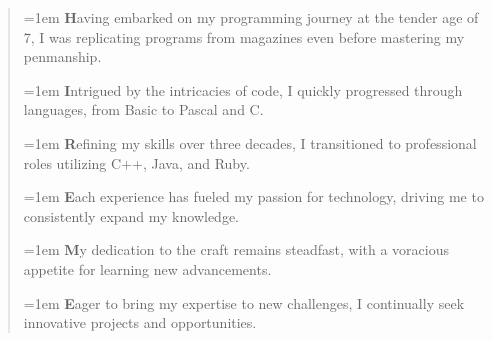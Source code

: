 \begin{minipage}{\linewidth}
\begin{quote}
    \hangindent=1em
    {\Large\textbf{H}}aving embarked on my programming journey at the tender age of 7, I was replicating programs from magazines even before mastering my penmanship.

    \hangindent=1em
    {\Large\textbf{I}}ntrigued by the intricacies of code, I quickly progressed through languages, from Basic to Pascal and C.

    \hangindent=1em
    {\Large\textbf{R}}efining my skills over three decades, I transitioned to professional roles utilizing C++, Java, and Ruby.

    \hangindent=1em
    {\Large\textbf{E}}ach experience has fueled my passion for technology, driving me to consistently expand my knowledge.

    \hangindent=1em
    {\Large\textbf{M}}y dedication to the craft remains steadfast, with a voracious appetite for learning new advancements.

    \hangindent=1em
    {\Large\textbf{E}}ager to bring my expertise to new challenges, I continually seek innovative projects and opportunities.
\end{quote}
\end{minipage}
